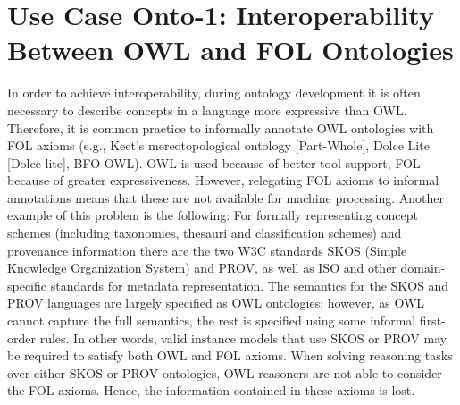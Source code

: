 \documentclass[10pt,fleqn,%
\ifpretendfinal
final%
\else
draft%
\fi,
]{scrreprt}
\begin{document}
%
%
%
%
%
%

\section{Use Case Onto-1: Interoperability Between OWL and FOL Ontologies}

In order to achieve interoperability, during ontology development it is often necessary to describe 
concepts in a language more expressive than OWL.  Therefore, it is common practice to informally 
annotate OWL ontologies with FOL axioms (e.g., Keet's mereotopological ontology [Part-Whole], 
Dolce Lite [Dolce-lite], BFO-OWL). OWL is used because of better tool support, FOL because of 
greater expressiveness. However, relegating FOL axioms to  informal annotations means that these 
are not available for machine processing.  Another example of this problem is the following: For 
formally representing concept schemes (including taxonomies, thesauri and classification schemes) 
and provenance information there are the two W3C standards SKOS (Simple Knowledge Organization 
System) and PROV, as well as ISO and other domain-specific  standards for 
metadata representation. The semantics for the SKOS and PROV languages are largely specified as OWL 
ontologies; however, as OWL cannot capture the full semantics, the rest is specified using some 
informal first-order rules. In other words, valid instance models that use SKOS or PROV may be 
required to satisfy both OWL and FOL axioms. When solving reasoning tasks over either SKOS or PROV 
ontologies, OWL reasoners are not able to consider the  FOL axioms. Hence, the information 
contained in these axioms is lost.
\end{document}
